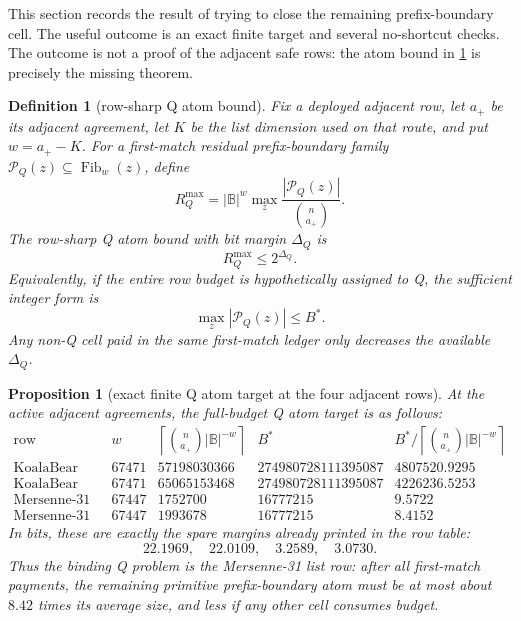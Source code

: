 \documentclass[a4paper,11pt]{amsart}
\newtheorem{proposition}[proposition]{Proposition}
\newtheorem{definition}[definition]{Definition}
\theoremstyle{remark}
\newcommand{\B}{\mathbb B}
\newcommand{\Fib}{\operatorname{Fib}}
\begin{document}
This section records the result of trying to close the remaining prefix-boundary cell.  The useful outcome is an exact finite target and several no-shortcut checks.  The outcome is not a proof of the adjacent safe rows: the atom bound in \cref{def:q-row-atom} is precisely the missing theorem.

\begin{definition}[row-sharp Q atom bound]\label{def:q-row-atom}
Fix a deployed adjacent row, let \(a_+\) be its adjacent agreement, let \(K\) be the list dimension used on that route, and put \(w=a_+-K\).  For a first-match residual prefix-boundary family \(\mathcal P_Q(z)\subseteq\Fib_w(z)\), define
\[
        R_Q^{\max}
        =
        |\B|^w\max_z\frac{|\mathcal P_Q(z)|}{\binom n{a_+}}.
\]
The row-sharp Q atom bound with bit margin \(\Delta_Q\) is
\[
        R_Q^{\max}\le 2^{\Delta_Q}.
\]
Equivalently, if the entire row budget is hypothetically assigned to Q, the sufficient integer form is
\[
        \max_z|\mathcal P_Q(z)|\le B^* .
\]
Any non-Q cell paid in the same first-match ledger only decreases the available \(\Delta_Q\).
\end{definition}

\begin{proposition}[exact finite Q atom target at the four adjacent rows]\label{prop:q-exact-target}
At the active adjacent agreements, the full-budget Q atom target is as follows:
\[
\begin{array}{c|r|r|r|r}
\text{row} & w & \left\lceil \binom n{a_+}|\B|^{-w}\right\rceil & B^* & B^*/\left\lceil \binom n{a_+}|\B|^{-w}\right\rceil\\
\hline
\text{KoalaBear MCA} & 67471 & 57198030366 & 274980728111395087 & 4807520.9295\\
\text{KoalaBear list} & 67471 & 65065153468 & 274980728111395087 & 4226236.5253\\
\text{Mersenne-31 MCA} & 67447 & 1752700 & 16777215 & 9.5722\\
\text{Mersenne-31 list} & 67447 & 1993678 & 16777215 & 8.4152
\end{array}
\]
In bits, these are exactly the spare margins already printed in the row table:
\[
        22.1969,
        \quad 22.0109,
        \quad 3.2589,
        \quad 3.0730 .
\]
Thus the binding Q problem is the Mersenne-31 list row: after all first-match payments, the remaining primitive prefix-boundary atom must be at most about \(8.42\) times its average size, and less if any other cell consumes budget.
\end{proposition}
\end{document}
